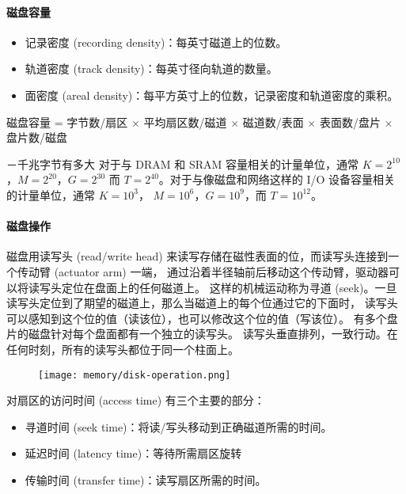 \paragraph{磁盘容量}
\begin{itemize}
    \item 记录密度 (recording density)：每英寸磁道上的位数。
    \item 轨道密度 (track density)：每英寸径向轨道的数量。
    \item 面密度 (areal density)：每平方英寸上的位数，记录密度和轨道密度的乘积。
\end{itemize}
\begin{center}
    磁盘容量 = 字节数/扇区 $\times$ 平均扇区数/磁道 $\times$ 磁道数/表面 $\times$ 表面数/盘片 $\times$ 盘片数/磁盘
\end{center}
\begin{sidenote}{－千兆字节有多大}
    对于与 DRAM 和 SRAM 容量相关的计量单位，通常 $K=2^{10}$，$M=2^{20}$，$G=2^{30}$ 而
    $T= 2^{40}$。对于与像磁盘和网络这样的 I/O 设备容量相关的计量单位，通常 $K = 10^{3}$，
    $M= 10^{6}$，$G = 10^{9}$，而 $T=10^{12}$。
\end{sidenote}

\paragraph{磁盘操作}

磁盘用读写头 (read/write head) 来读写存储在磁性表面的位，而读写头连接到一个传动臂 (actuator arm) 一端，
通过沿着半径轴前后移动这个传动臂，驱动器可以将读写头定位在盘面上的任何磁道上。
这样的机械运动称为寻道 (seek)。一旦读写头定位到了期望的磁道上，那么当磁道上的每个位通过它的下面时，
读写头可以感知到这个位的值（读该位），也可以修改这个位的值（写该位）。
有多个盘片的磁盘针对每个盘面都有一个独立的读写头。
读写头垂直排列，一致行动。在任何时刻，所有的读写头都位于同一个柱面上。

\begin{figure}[H]
    \centering
    \texttt{[image: memory/disk-operation.png]}
\end{figure}

对扇区的访问时间 (access time) 有三个主要的部分：
\begin{itemize}
    \item 寻道时间 (seek time)：将读/写头移动到正确磁道所需的时间。
    \item 延迟时间 (latency time)：等待所需扇区旋转
    \item 传输时间 (transfer time)：读写扇区所需的时间。
\end{itemize}

